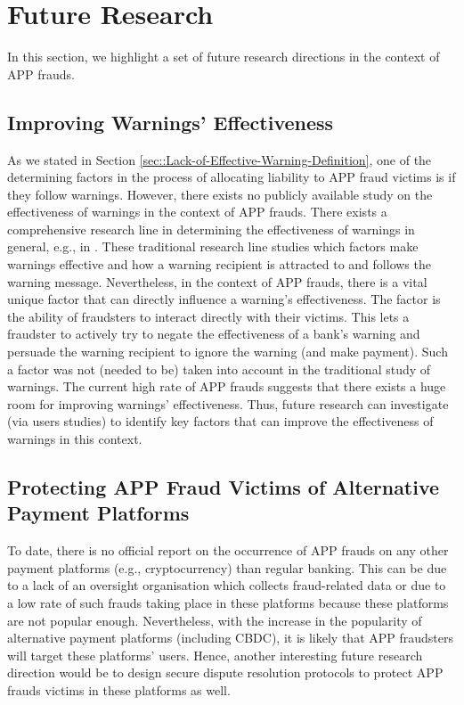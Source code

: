 

\section{Future Research}


In this section, we highlight a set of future research directions in the context of APP frauds. 

\subsection{Improving Warnings' Effectiveness}

As we stated in  Section \ref{sec::Lack-of-Effective-Warning-Definition},  one of the determining factors in the process of allocating liability to APP fraud victims is if they follow warnings. However,  there exists no publicly available study on the effectiveness of warnings in  the context of APP frauds. There exists a comprehensive research line in determining the effectiveness of warnings in general, e.g., in \cite{brinton2016users,felt2014experimenting,laughery2006designing}. These traditional research line studies which factors make warnings effective and how a warning recipient is attracted to and follows the warning message. Nevertheless, in the context of APP frauds, there is a vital unique factor that can directly influence a warning's effectiveness. The factor is the ability of  fraudsters to interact directly with their victims. This lets a fraudster to actively try to negate the effectiveness of a bank's warning and persuade the warning recipient to ignore the warning (and make payment). Such a factor was not (needed to be) taken into account in the traditional study of warnings. The current high rate of  APP frauds suggests that there exists a huge room for improving warnings' effectiveness. Thus, future research can investigate (via  users studies) to identify  key factors that can improve the effectiveness of warnings in this context. 


\subsection{Protecting APP Fraud Victims of Alternative Payment Platforms}

To date, there is no official report on the occurrence of APP frauds on any other payment platforms (e.g., cryptocurrency) than  regular banking. This can be due to a lack of an oversight organisation which  collects fraud-related data or due to a low rate of such frauds taking place in these platforms because these platforms are not popular enough. Nevertheless,  with the increase in the popularity of  alternative payment platforms (including CBDC), it is likely that APP fraudsters will target these platforms' users. Hence, another interesting future research direction would be to design secure dispute resolution protocols  to protect  APP frauds victims in these platforms as well. 

